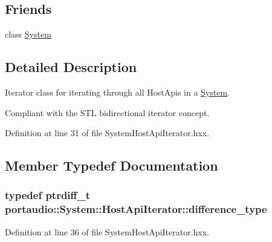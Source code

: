 \subsection*{Friends}
\begin{DoxyCompactItemize}
\item 
class \hyperlink{classportaudio_1_1_system_1_1_host_api_iterator_af18a9ee98e70982bfe2975391d7221a5}{System}
\end{DoxyCompactItemize}


\subsection{Detailed Description}
Iterator class for iterating through all Host\+Apis in a \hyperlink{classportaudio_1_1_system}{System}. 

Compliant with the S\+TL bidirectional iterator concept. 

Definition at line 31 of file System\+Host\+Api\+Iterator.\+hxx.



\subsection{Member Typedef Documentation}
\subsubsection[{\texorpdfstring{difference\+\_\+type}{difference_type}}]{\setlength{\rightskip}{0pt plus 5cm}typedef ptrdiff\+\_\+t {\bf portaudio\+::\+System\+::\+Host\+Api\+Iterator\+::difference\+\_\+type}}\hypertarget{classportaudio_1_1_system_1_1_host_api_iterator_aa3af97941dbfe27b3d2160543b434cc1}{}\label{classportaudio_1_1_system_1_1_host_api_iterator_aa3af97941dbfe27b3d2160543b434cc1}


Definition at line 36 of file System\+Host\+Api\+Iterator.\+hxx.


